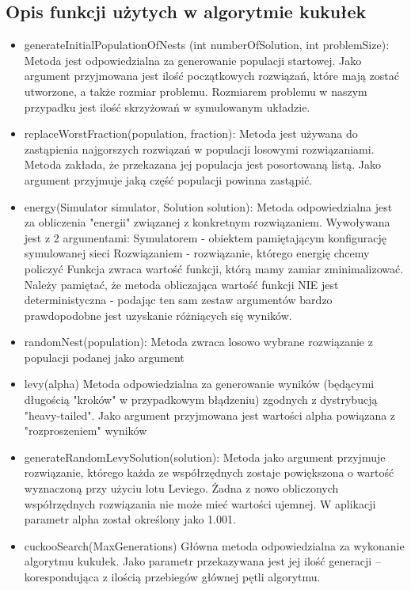 \documentclass{article}
\begin{document}
\subsection {Opis funkcji użytych w algorytmie kukułek}
\begin{itemize}
\item generateInitialPopulationOfNests (int numberOfSolution, int problemSize):
    Metoda jest odpowiedzialna za generowanie populacji startowej. Jako argument przyjmowana jest ilość początkowych rozwiązań,
  które mają zostać utworzone, a także rozmiar problemu. Rozmiarem problemu w naszym przypadku jest ilość skrzyżowań w symulowanym układzie.

\item replaceWorstFraction(population, fraction):
    Metoda jest używana do zastąpienia najgorszych rozwiązań w populacji losowymi rozwiązaniami. Metoda zakłada, że przekazana jej populacja jest posortowaną listą. 
Jako argument przyjmuje jaką część populacji powinna zastąpić. 

\item energy(Simulator simulator, Solution solution):
    Metoda odpowiedzialna jest za obliczenia "energii" związanej z konkretnym rozwiązaniem. 
    Wywoływana jest z 2 argumentami: 
      Symulatorem - obiektem pamiętającym konfigurację symulowanej sieci  
      Rozwiązaniem - rozwiązanie, którego energię chcemy policzyć 
    Funkcja zwraca wartość funkcji, którą mamy zamiar zminimalizować. 
Należy pamiętać, że metoda obliczająca wartość funkcji NIE jest deterministyczna - podając ten sam zestaw argumentów bardzo prawdopodobne jest uzyskanie różniących się wyników. 

\item randomNest(population):
    Metoda zwraca losowo wybrane rozwiązanie z populacji podanej jako argument

\item levy(alpha)
    Metoda odpowiedzialna za generowanie wyników (będącymi długością "kroków" w przypadkowym błądzeniu) zgodnych z dystrybucją "heavy-tailed".
 Jako argument przyjmowana jest wartości alpha powiązana z "rozproszeniem" wyników

\item generateRandomLevySolution(solution):
    Metoda jako argument przyjmuje rozwiązanie, którego każda ze współrzędnych zostaje powiększona o wartość wyznaczoną przy użyciu lotu Leviego. Żadna z nowo obliczonych współrzędnych rozwiązania nie może mieć wartości ujemnej.
W aplikacji parametr alpha został określony jako 1.001.

\item cuckooSearch(MaxGenerations)
 Główna metoda odpowiedzialna za wykonanie algorytmu kukułek. Jako parametr przekazywana jest jej ilość generacji – korespondująca z ilością przebiegów głównej pętli algorytmu. 
\end{itemize}
\end{document}
